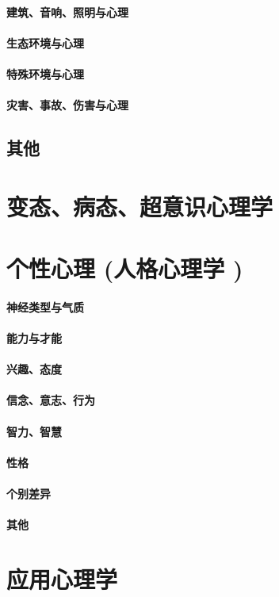 \documentclass[UTF8]{../RepresentationUniverse}
\begin{document}
        \subsubsection{建筑、音响、照明与心理}
        \subsubsection{生态环境与心理}
        \subsubsection{特殊环境与心理}
        \subsubsection{灾害、事故、伤害与心理}
    \section{其他}

\chapter{变态、病态、超意识心理学}

\chapter{个性心理 (人格心理学 )}
\subsubsection{神经类型与气质}
\subsubsection{能力与才能}
\subsubsection{兴趣、态度}
\subsubsection{信念、意志、行为}
\subsubsection{智力、智慧}
\subsubsection{性格}
\subsubsection{个别差异}
\subsubsection{其他}
\chapter{应用心理学}
\end{document}
